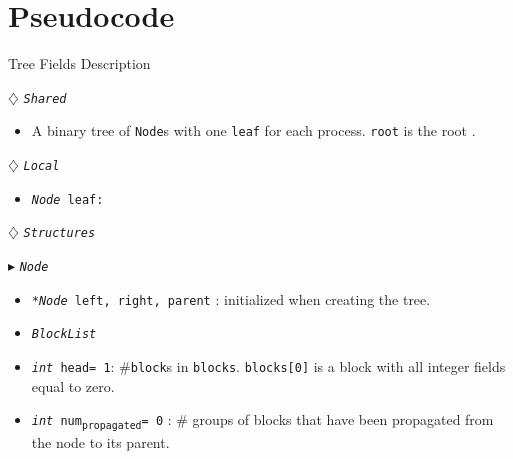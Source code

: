 \documentclass[10pt]{article}
\newcommand{\sub}[1]{\textsubscript{#1}}
\renewcommand{\tt}[1]{\texttt{#1}}
\renewcommand{\sl}[1]{\textsl{#1}}
\renewcommand{\bf}[1]{\textbf{#1}}
\newcommand{\nf}[1]{{\normalfont{\texttt{#1}}}}
\newcommand{\head}{head}
\theoremstyle{definition}
\begin{document}
\section{Pseudocode}

\begin{algorithm}
\caption{Tree Fields Description}
\begin{algorithmic}[1]
\setcounter{ALG@line}{100}
\begin{multicols}{2}


\Statex $\diamondsuit$ \tt{\sl{Shared}}
\begin{itemize}
\item \textsf{A binary tree of \tt{Node}s with one \tt{leaf} for each process. \tt{root} is the root \nf{node}.}
\end{itemize}

\Statex

\Statex $\diamondsuit$ \tt{\sl{Local}}
\begin{itemize}
\item \tt{\sl{Node} leaf:} 
\end{itemize}

\Statex
\Statex $\diamondsuit$ \tt{\sl{Structures}}

\Statex $\blacktriangleright$ \tt{\sl{Node}}
\begin{itemize}
\item \tt{\sl{*Node} left, right, parent} \textsf{: initialized  when creating the tree.}
\item \tt{\sl{BlockList}}
\item \tt{\sl{int} \head= 1}\textsf{: \#\tt{block}s in \tt{blocks}. \tt{blocks[0]} is a block with all integer fields equal to zero.}
\item \tt{\sl{int} num\sub{propagated}= 0}\textsf{} \textsf{: \# groups of blocks that have been propagated from the node to its parent.}
\end{itemize}

%  
%
%  


\end{multicols}
\end{algorithmic}
\end{algorithm}
\end{document}
